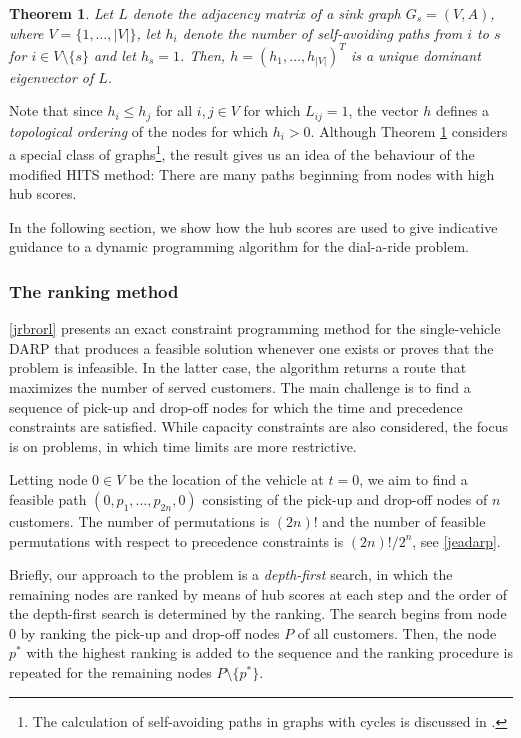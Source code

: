\documentclass[dissertation,draft*]{aaltoseries}
\newtheorem{theorem}{Theorem}
\begin{document}
\begin{theorem}
\label{polut}
Let $L$ denote the adjacency matrix of a sink graph $G_s=(V,A)$, where $V=\{1,\ldots,|V|\}$,  
let $h_i$ denote the number of self-avoiding paths from $i$ to $s$ for $i \in V \setminus \{s\}$ and let $h_s=1$. 
Then, $h=(h_1,\ldots,h_{|V|})^T$ is a unique dominant eigenvector of $L$.
\end{theorem}

Note that since $h_i \leq h_j$ for all $i,j \in V$ for which $L_{ij} = 1$, the vector $h$ defines a \emph{topological
ordering} \cite{cormen} of the nodes for which $h_i > 0$.
Although Theorem \ref{polut} considers a special class of 
graphs\footnote{The calculation of self-avoiding paths in graphs with cycles is discussed in \cite{ponstein}.}, 
the result gives us an idea of the behaviour of the modified HITS method: There are many paths beginning from 
nodes with high hub scores. 

In the following section, we show how the 
hub scores are used to give indicative guidance to 
a dynamic programming algorithm for the dial-a-ride problem.

\subsubsection{The ranking method}
\label{svsolution}
\ref{jrbrorl} presents an exact constraint programming method for the single-vehicle DARP that 
produces a feasible solution whenever one exists or proves that the problem is infeasible.
In the latter case, the algorithm returns a route that maximizes the number of served customers.
The main challenge is to find a sequence of pick-up and drop-off nodes for which 
the time and precedence constraints are satisfied. While capacity constraints are 
also considered, the focus is on problems, in which time limits are more restrictive.

Letting node $0 \in V$ be the location of the vehicle at $t=0$,
we aim to find a feasible path $(0,p_1,\ldots,p_{2n},0)$
consisting of the pick-up and drop-off nodes of $n$ customers.
The number of permutations is $(2n)!$ and the number of feasible permutations
with respect to precedence constraints is $(2n)!/2^n$, see \ref{jeadarp}.

Briefly, our approach to the problem is a \emph{depth-first} search, in which the
remaining nodes are ranked by means of hub scores at each step and the order of the depth-first search is determined by the 
ranking. %
The search begins from node $0$ by ranking the pick-up and drop-off nodes $P$ of all customers.
Then, the node $p^{*}$ with the highest ranking is added to the sequence and the ranking procedure is
repeated for the remaining nodes $P \setminus \{p^{*}\}$.
\end{document}
